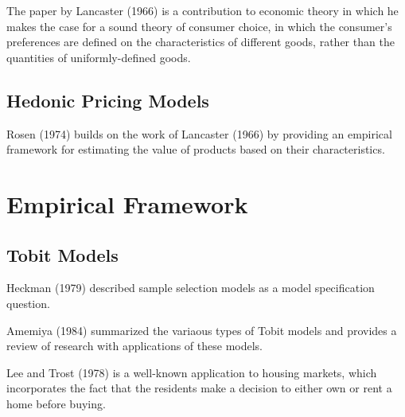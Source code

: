 The paper by Lancaster (1966) is a contribution to economic theory in which he makes the case for a sound theory of consumer choice, 
in which the consumer's preferences are defined on the characteristics of different goods, 
rather than the quantities of uniformly-defined goods.


\subsection{Hedonic Pricing Models}

Rosen (1974) builds on the work of Lancaster (1966)
by providing an empirical framework for estimating the value
of products based on their characteristics. 



\section{Empirical Framework}

\subsection{Tobit Models}

Heckman (1979) described sample selection models as a model specification question. 

Amemiya (1984) summarized the variaous types of Tobit models
and provides a review of research with applications of these models. 

Lee and Trost (1978) is a well-known application to housing markets, 
which incorporates the fact that the residents make a decision
to either own or rent a home before buying. 


% 
